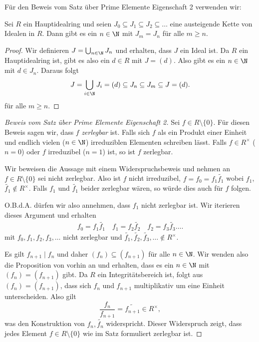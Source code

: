 Für den Beweis vom Satz über Prime Elemente Eigenschaft 2 verwenden wir:
\begin{proposition}
	Sei $R$ ein Hauptidealring und seien $J_0 \subseteq J_1 \subseteq J_2 \subseteq \ldots$ eine austeigende Kette von Idealen in $R$.
	Dann gibt es ein $n \in \N$ mit $J_{m} = J_{n}$ für alle $m \geq n$.
\end{proposition}

\begin{proof}
	Wir definieren $J = \bigcup_{n \in \N} J_{n}$ und erhalten, dass $J$ ein Ideal ist.
	Da $R$ ein Hauptidealring ist, gibt es also ein $d \in R$ mit $J = (d)$.
	Also gibt es ein $n \in \N$ mit $d \in J_{n}$. Daraus folgt 
	\[
		J = \bigcup_{i \in \N} J_{i} = (d) \subseteq J_{n} \subseteq J_{m} \subseteq J = (d)
	.\] 
	für alle $m \geq n$.

\end{proof}

\begin{proof}[Beweis vom Satz über Prime Elemente Eigenschaft 2]
	Sei $f \in R \setminus \{0\} $. Für diesen Beweis sagen wir, dass $f$ \emph{zerlegbar} ist.
	Falls sich $f$ als ein Produkt einer Einheit und endlich vielen ($n \in \N$) irreduziblen Elementen schreiben lässt.
	Falls $f \in R^{\times}$ ($n = 0$) oder $f$ irreduzibel ($n = 1$) ist, so ist $f$ zerlegbar.

	Wir beweisen die Aussage mit einem Widerspruchsbeweis und nehmen an $f \in R \setminus \{0\} $ sei nicht zerlegbar.
	Also ist $f$ nicht irreduzibel, $f = f_0 = f_1 \widetilde{f_1}$ wobei $f_1$, $\widetilde{f_1} \not\in R^{\times}$.
	Falls $f_1$ und $\widetilde{f_1}$ beider zerlegbar wären, so würde dies auch für $f$ folgen.

	O.B.d.A. dürfen wir also annehmen, dass $f_1$ nicht zerlegbar ist.
	Wir iterieren dieses Argument und erhalten
	\begin{align*}
		f_0 = f_1 \widetilde{f_1} \quad f_1 = f_2 \widetilde{f_2} \quad f_2 = f_3 \widetilde{f_3} \ldots
	.\end{align*}
	mit $f_0, f_1,f_2,f_3,\ldots$ nicht zerlegbar und $\widetilde{f_1}, \widetilde{f_2}, \widetilde{f_3},\ldots \not\in  R^{\times}$.

	Es gilt $f_{n+1} \mid f_{n}$ und daher $(f_{n}) \subseteq (f_{n+1})$ für alle $n \in \N$.
	Wir wenden also die Proposition von vorhin an und erhalten, dass es ein $n \in \N$ mit $(f_{n}) = (f_{n+1})$ gibt.
	Da $R$ ein Integritätsbereich ist, folgt aus $(f_{n}) = (f_{n+1})$, dass sich $f_{n}$ und $f_{n+1}$ multiplikativ um eine Einheit unterscheiden.
	Also gilt 
	\[
	\frac{f_{n}}{f_{n+1}} = \widetilde{f_{n+1}} \in R^{\times}
	,\] 
	was den Konstruktion von $f_{n}, \widetilde{f_{n}}$ widerspricht.
	Dieser Widerspruch zeigt, dass jedes Element $f \in R \setminus \{0\} $ wie im Satz formuliert zerlegbar ist.
\end{proof}

